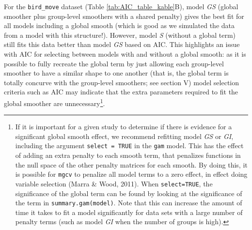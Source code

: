 \documentclass[12pt]{article}
\let\rmarkdownfootnote\footnote%
\def\footnote{\protect\rmarkdownfootnote}
\begin{document}
For the \texttt{bird\_move} dataset (Table \ref{tab:AIC_table_kable}B),
model \emph{GS} (global smoother plus group-level smoothers with a
shared penalty) gives the best fit for all models including a global
smooth (which is good as we simulated the data from a model with this
structure!). However, model \emph{S} (without a global term) still fits
this data better than model \emph{GS} based on AIC. This highlights an
issue with AIC for selecting between models with and without a global
smooth: as it is possible to fully recreate the global term by just
allowing each group-level smoother to have a similar shape to one
another (that is, the global term is totally concurve with the
group-level smoothers; see section V) model selection criteria such as
AIC may indicate that the extra parameters required to fit the global
smoother are unnecessary\footnote{If it is important for a given study
  to determine if there is evidence for a significant global smooth
  effect, we recommend refitting model \emph{GS} or \emph{GI}, including
  the argument \texttt{select\ =\ TRUE} in the \texttt{gam} model. This
  has the effect of adding an extra penalty to each smooth term, that
  penalizes functions in the null space of the other penalty matrices
  for each smooth. By doing this, it is possible for \texttt{mgcv} to
  penalize all model terms to a zero effect, in effect doing variable
  selection (Marra \& Wood, 2011). When \texttt{select=TRUE}, the
  significance of the global term can be found by looking at the
  significance of the term in \texttt{summary.gam(model)}. Note that
  this can increase the amount of time it takes to fit a model
  significantly for data sets with a large number of penalty terms (such
  as model \emph{GI} when the number of groups is high).}.
\end{document}
